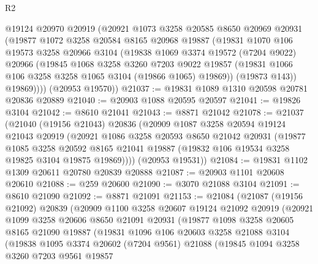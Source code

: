 \begin{lexlean}{R2}
\begin{coremodule}
        @19124
        @20970
        @20919
        (@20921
          @1073
          @3258
          @20585
          @8650
          @20969
          @20931
          (@19877
            @1072
            @3258
            @20584
            @8165
            @20968
            @19887
            (@19831
              @1070
              @106
              @19573
              @3258
              @20966
              @3104
              (@19838
                @1069
                @3374
                @19572
                (@7204 @9022)
                @20966
                (@19845
                  @1068
                  @3258
                  @3260
                  @7203
                  @9022
                  @19857
                  (@19831 @1066 @106 @3258 @3258 @1065 @3104 (@19866 @1065) @19869))
                (@19873 @143))
              @19869))))
      (@20953 @19570))
@21037 := @19831 @1089 @1310 @20598 @20781 @20836 @20889
@21040 := @20903 @1088 @20595 @20597
@21041 := @19826 @3104
@21042 := @8610 @21041
@21043 := @8871 @21042
@21078 := @21037
    (@21040
      (@19156 @21043)
      @20836
      (@20909
        @1087
        @3258
        @20594
        @19124
        @21043
        @20919
        (@20921
          @1086
          @3258
          @20593
          @8650
          @21042
          @20931
          (@19877
            @1085
            @3258
            @20592
            @8165
            @21041
            @19887
            (@19832 @106 @19534 @3258 @19825 @3104 @19875 @19869))))
      (@20953 @19531))
@21084 := @19831 @1102 @1309 @20611 @20780 @20839 @20888
@21087 := @20903 @1101 @20608 @20610
@21088 := @259 @20600
@21090 := @3070 @21088 @3104
@21091 := @8610 @21090
@21092 := @8871 @21091
@21153 := @21084
    (@21087
      (@19156 @21092)
      @20839
      (@20909
        @1100
        @3258
        @20607
        @19124
        @21092
        @20919
        (@20921
          @1099
          @3258
          @20606
          @8650
          @21091
          @20931
          (@19877
            @1098
            @3258
            @20605
            @8165
            @21090
            @19887
            (@19831
              @1096
              @106
              @20603
              @3258
              @21088
              @3104
              (@19838
                @1095
                @3374
                @20602
                (@7204 @9561)
                @21088
                (@19845
                  @1094
                  @3258
                  @3260
                  @7203
                  @9561
                  @19857

\end{coremodule}
\end{lexlean}
